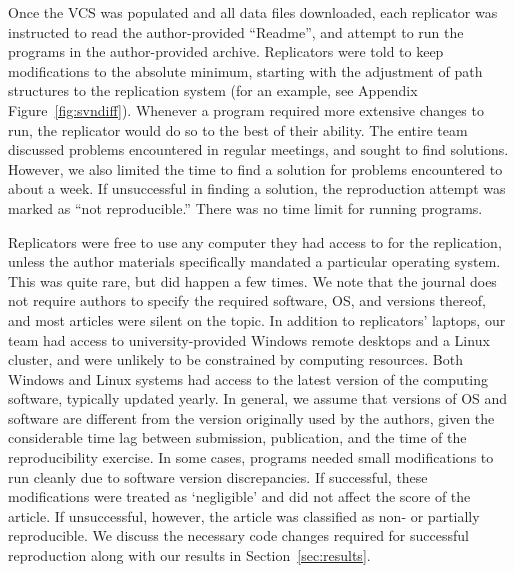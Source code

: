 \documentclass{cje} %
\theoremstyle{plain}%
\theoremstyle{definition}
\theoremstyle{remark}
\begin{document}
Once the \ac{VCS}  was populated and all data files  downloaded, each replicator was instructed to  read the author-provided ``Readme'', and attempt to run the programs in the author-provided archive. Replicators were told to keep modifications to the absolute minimum, starting with the adjustment of path structures to the replication system (for an example, see Appendix Figure~\ref{fig:svndiff}). Whenever a program required more extensive changes to run, the replicator would do so to the best of their ability. 
The entire team discussed problems encountered in regular meetings, and sought to find solutions. However, we also limited the time to find a solution for problems encountered to about a week. If unsuccessful in finding a solution, the reproduction attempt was marked as ``not reproducible.'' There was no time limit for running programs.

Replicators were free to use any computer they had access to for the replication, unless the author materials specifically mandated a particular operating system. This was quite rare, but did happen a few times. We note that the journal does not require authors to specify the required software, \ac{OS}, and versions thereof, and most articles were silent on the topic. In addition to replicators' laptops, our team had access to university-provided Windows remote desktops and a Linux cluster, and were unlikely to be constrained by computing resources. Both Windows and Linux systems had access to the latest version of the computing software, typically updated yearly.
%
In general, we assume that versions of \ac{OS} and software are different from the version originally used by the authors, given the considerable time lag between submission, publication, and the time of the reproducibility exercise. In some cases, programs needed small modifications to run cleanly due to software version discrepancies. If successful, these modifications were treated as `negligible' and did not affect the score of the article. If unsuccessful, however, the article was classified as non- or partially reproducible. We discuss the necessary code changes required for successful reproduction along with our results in Section~\ref{sec:results}.
\end{document}
